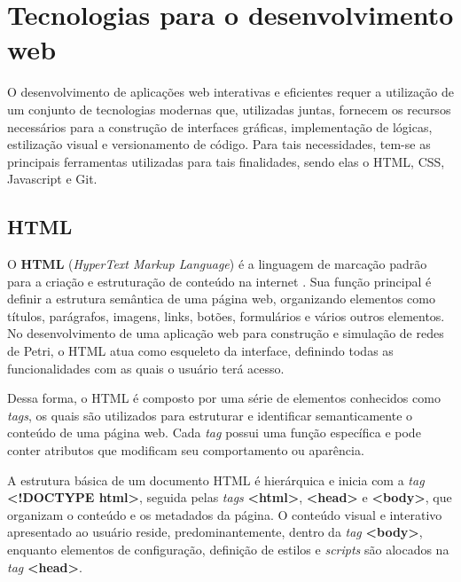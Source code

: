\documentclass[
	12pt,				%
	openright,			%
	oneside,			%
	a4paper,			%
	english,			%
	brazil				%
	]{abntex2}
\theoremstyle{doispontos}
\begin{document}

\section{Tecnologias para o desenvolvimento web} \label{cap:tecnologiaweb}

O desenvolvimento de aplicações web interativas e eficientes requer a utilização de um conjunto de tecnologias modernas que, utilizadas juntas, fornecem os recursos necessários para a construção de interfaces gráficas, implementação de lógicas, estilização visual e versionamento de código. Para tais necessidades, tem-se as principais ferramentas utilizadas para tais finalidades, sendo elas o HTML, CSS, Javascript e Git. 

\subsection{HTML}

O \textbf{HTML} (\textit{HyperText Markup Language}) é a linguagem de marcação padrão para a criação e estruturação de conteúdo na internet \textcite{mdn_html}. Sua função principal é definir a estrutura semântica de uma página web, organizando elementos como títulos, parágrafos, imagens, links, botões, formulários e vários outros elementos. No desenvolvimento de uma aplicação web para construção e simulação de redes de Petri, o HTML atua como esqueleto da interface, definindo todas as funcionalidades com as quais o usuário terá acesso. 
  
Dessa forma, o HTML é composto por uma série de elementos conhecidos como \textit{tags}, os quais são utilizados para estruturar e identificar semanticamente o conteúdo de uma página web. Cada {\textit{tag}} possui uma função específica e pode conter atributos que modificam seu comportamento ou aparência.

A estrutura básica de um documento HTML é hierárquica e inicia com a \textit{tag} \textbf{<!DOCTYPE html>}, seguida pelas \textit{tags} \textbf{<html>}, \textbf{<head>} e \textbf{<body>}, que organizam o conteúdo e os metadados da página. O conteúdo visual e interativo apresentado ao usuário reside, predominantemente, dentro da \textit{tag} \textbf{<body>}, enquanto elementos de configuração, definição de estilos e \textit{scripts} são alocados na \textit{tag} \textbf{<head>}. 
\end{document}
